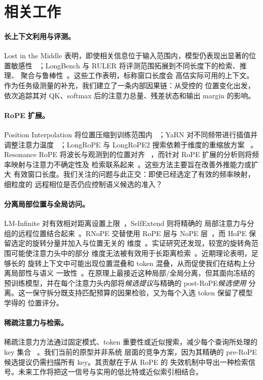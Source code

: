 \section{相关工作}
\label{sec:related}

\paragraph{长上下文利用与评测。}
Lost in the Middle 表明，即使相关信息位于输入范围内，模型仍表现出显著的位置敏感性
~\citep{liu2024lost}；LongBench 与 RULER 将评测范围拓展到不同长度下的检索、推理、
聚合与鲁棒性~\citep{bai2024longbench,hsieh2024ruler}。这些工作表明，标称窗口长度会
高估实际可用的上下文。作为任务级测量的补充，我们建立了一条内部因果链：从受控的
位置变化出发，依次追踪其对 QK、softmax 后的注意力总量、残差状态和输出 margin 的影响。

\paragraph{RoPE 扩展。}
Position Interpolation 将位置压缩到训练范围内
~\citep{chen2023positioninterpolation}；YaRN 对不同频带进行插值并调整注意力温度
~\citep{peng2024yarn}；LongRoPE 与 LongRoPE2 搜索依赖于维度的重缩放方案
~\citep{ding2024longrope,shang2025longrope2}。Resonance RoPE 将波长与观测到的位置对齐
~\citep{wang2024resonance}，而针对 RoPE 扩展的分析则将频率映射与注意力不确定性及
检索联系起来~\citep{zhong2025understanding}。这些方法主要旨在改善外推能力或扩大
有效窗口长度。我们关注的问题与此正交：即使已经选定了有效的频率映射，细粒度的
远程相位是否仍应控制语义候选的准入？

\paragraph{分离局部位置与全局访问。}
LM-Infinite 对有效相对距离设置上限~\citep{han2024lminfinite}，SelfExtend 则将精确的
局部注意力与分组的远程位置结合起来~\citep{jin2024selfextend}。RNoPE 交替使用 RoPE
层与 NoPE 层~\citep{yang2025rnope}，而 HoPE 保留选定的旋转分量并加入与位置无关的
维度~\citep{chen2025hope}。实证研究还发现，较宽的旋转角范围可能使注意力头中的部分
维度无法被有效用于长距离检索~\citep{chiang2025dimension}。近期理论表明，足够长的
旋转上下文中可能出现位置混叠和 token 混叠，从而促使我们在结构上分离局部性与语义
一致性~\citep{du2026rope}。\method 在原理上最接近这种局部/全局分离，但其面向冻结的
预训练模型，并在每个注意力头内部将\emph{候选提议}与精确的 post-RoPE\emph{候选使用}
分离。这一保守拆分既支持匹配预算的因果检验，又为每个入选 token 保留了模型学得的
位置评分。

\paragraph{稀疏注意力与检索。}
稀疏注意力方法通过固定模式、token 重要性或近似搜索，减少每个查询所处理的 key 集合
~\citep{beltagy2020longformer,zaheer2020bigbird,zhang2023h2o}。我们当前的原型并非系统
层面的竞争方案，因为其精确的 pre-RoPE 候选提议仍需扫描所有 key。其贡献在于从 RoPE 的
失效机制中导出一种检索信号。未来工作将把这一信号与实用的低比特或近似索引相结合。
